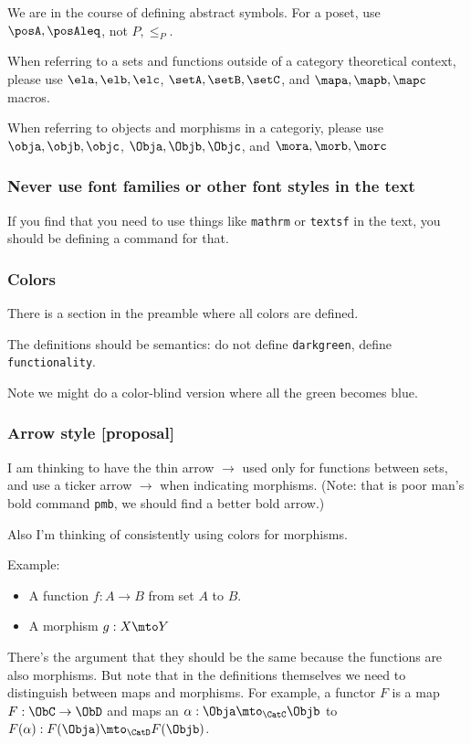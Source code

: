 We are in the course of defining abstract symbols.
For a poset, use $\posA,\posAleq$, not $P,\leq_P$.

When referring to a sets and functions outside of a category theoretical context, please use $\ela,\elb,\elc$, $\setA,\setB,\setC$, and $\mapa,\mapb,\mapc$ macros.

When referring to objects and morphisms in a categoriy, please use $\obja,\objb,\objc$, $\Obja,\Objb,\Objc$, and $\mora,\morb,\morc$


\subsubsection*{Never use font families or other font styles in the text}

If you find that you need to use things like \texttt{mathrm} or \texttt{textsf} in the text, you should be defining a command for that.

\subsubsection*{Colors}

There is a section in the preamble where all colors are defined.

The definitions should be semantics: do not define \texttt{darkgreen}, define \texttt{functionality}.

Note we might do a color-blind version where all the green becomes blue.


\subsubsection*{Arrow style [proposal]}

I am thinking to have the thin arrow $\to$ used only for functions between sets, and use a ticker arrow $\pmb{\to}$ when indicating morphisms.
(Note: that is poor man's bold command \texttt{pmb}, we should find a better bold arrow.)


Also I'm thinking of consistently using colors for morphisms.

Example:
\begin{itemize}
  \item A function $f: A \to B$ from set $A$ to $B$.
  \item A morphism $g: X \mto  Y$
\end{itemize}

There's the argument that they should be the same because the functions are also morphisms. But note that in the definitions themselves we need to distinguish between maps and morphisms. For example, a functor $F$ is a map $F: \ObC \to \ObD$ and maps an $\alpha: \Obja \mto_{\CatC} \Objb $ to $F(\alpha): F(\Obja) \mto_{\CatD} F(\Objb) $.


